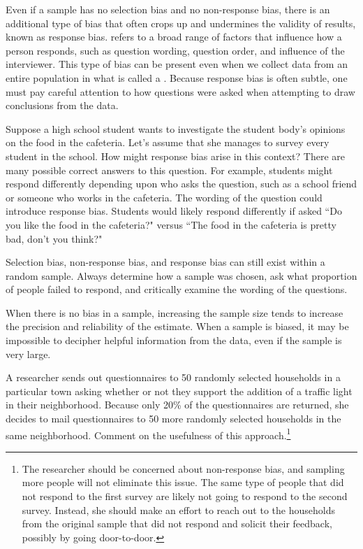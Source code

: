 Even if a sample has no selection bias and no non-response bias, there is an additional type of bias that often crops up and undermines the validity of results, known as response bias.  refers to a broad range of factors that influence how a person responds, such as question wording, question order, and influence of the interviewer. This type of bias can be present even when we collect data from an entire population in what is called a . Because response bias is often subtle, one must pay careful attention to how questions were asked when attempting to draw conclusions from the data.

\begin{example}{Suppose a high school student wants to investigate the student body's opinions on the food in the cafeteria. Let's assume that she manages to survey every student in the school. How might response bias arise in this context?}
There are many possible correct answers to this question. For example, students might respond differently depending upon who asks the question, such as a school friend or someone who works in the cafeteria. The wording of the question could introduce response bias. Students would likely respond differently if asked ``Do you like the food in the cafeteria?" versus ``The food in the cafeteria is pretty bad, don't you think?"
\end{example}

\begin{tipBox}{
Selection bias, non-response bias, and response bias can still exist within a random sample. Always determine how a sample was chosen, ask what proportion of people failed to respond, and critically examine the wording of the questions.}
\end{tipBox}

When there is no bias in a sample, increasing the sample size tends to increase the precision and reliability of the estimate. When a sample is biased, it may be impossible to decipher helpful information from the data, even if the sample is very large.

\textA{\pagebreak}

\begin{exercise}
A researcher sends out questionnaires to 50 randomly selected households in a particular town asking whether or not they support the addition of a traffic light in their neighborhood. Because only 20\% of the questionnaires are returned, she decides to mail questionnaires to 50 more randomly selected households in the same neighborhood. Comment on the usefulness of this approach.\footnote{The researcher should be concerned about non-response bias, and sampling more people will not eliminate this issue. The same type of people that did not respond to the first survey are likely not going to respond to the second survey. Instead, she should make an effort to reach out to the households from the original sample that did not respond and solicit their feedback, possibly by going door-to-door.}
\end{exercise}




